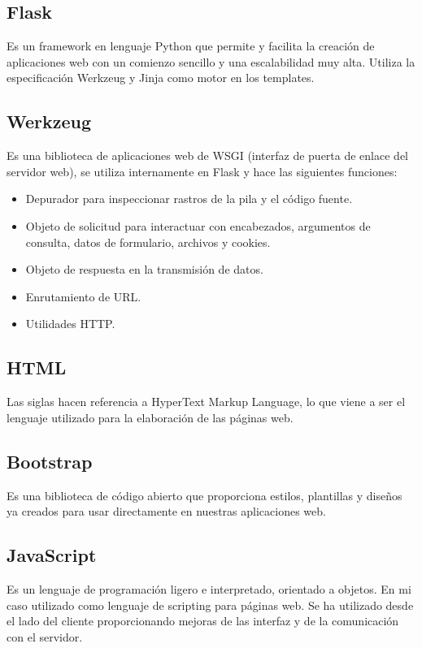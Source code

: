 
\subsection{Flask}
Es un framework en lenguaje Python que permite y facilita la creación de aplicaciones web con un comienzo sencillo y una escalabilidad muy alta. Utiliza la especificación Werkzeug y Jinja como motor en los templates.

\subsection{Werkzeug}
Es una biblioteca de aplicaciones web de WSGI (interfaz de puerta de enlace del servidor web), se utiliza internamente en Flask y hace las siguientes funciones:
\begin{itemize}
\item Depurador para inspeccionar rastros de la pila y el código fuente.
\item Objeto de solicitud para interactuar con encabezados, argumentos de consulta, datos de formulario, archivos y cookies.
\item Objeto de respuesta en la transmisión de datos.
\item Enrutamiento de URL.
\item Utilidades HTTP.
\end{itemize}

\subsection{HTML}
Las siglas hacen referencia a HyperText Markup Language, lo que viene a ser el lenguaje utilizado para la elaboración de las páginas web.

\subsection{Bootstrap}
Es una biblioteca de código abierto que proporciona estilos, plantillas y diseños ya creados para usar directamente en nuestras aplicaciones web.
 
\subsection{JavaScript}
Es un lenguaje de programación ligero e interpretado, orientado a objetos. En mi caso utilizado como lenguaje de scripting para páginas web. Se ha utilizado desde el lado del cliente proporcionando mejoras de las interfaz y de la comunicación con el servidor.


